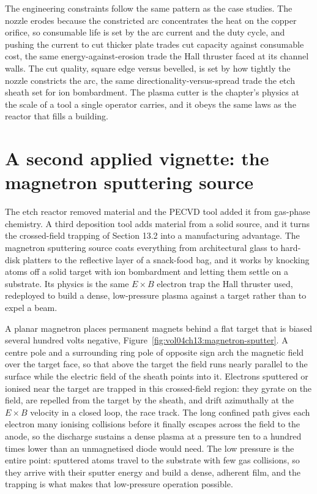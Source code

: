 The engineering constraints follow the same pattern as the case studies. The
nozzle erodes because the constricted arc concentrates the heat on the
copper orifice, so consumable life is set by the arc current and the
duty cycle, and pushing the current to cut thicker plate trades cut capacity
against consumable cost, the same energy-against-erosion trade the Hall
thruster faced at its channel walls. The cut quality, square edge versus
bevelled, is set by how tightly the nozzle constricts the arc, the same
directionality-versus-spread trade the etch sheath set for ion bombardment.
The plasma cutter is the chapter's physics at the scale of a tool a single
operator carries, and it obeys the same laws as the reactor that fills a
building.

\section{A second applied vignette: the magnetron sputtering source}

The etch reactor removed material and the PECVD tool added it from gas-phase
chemistry. A third deposition tool adds material from a solid source, and it
turns the crossed-field trapping of Section 13.2 into a manufacturing advantage.
The magnetron sputtering source coats everything from architectural glass to
hard-disk platters to the reflective layer of a snack-food bag, and it works by
knocking atoms off a solid target with ion bombardment and letting them settle
on a substrate. Its physics is the same $E\times B$ electron trap the Hall
thruster used, redeployed to build a dense, low-pressure plasma against a target
rather than to expel a beam.

A planar magnetron places permanent magnets behind a flat target that is biased
several hundred volts negative, Figure~\ref{fig:vol04ch13:magnetron-sputter}. A
centre pole and a surrounding ring pole of opposite sign arch the magnetic field
over the target face, so that above the target the field runs nearly parallel to
the surface while the electric field of the sheath points into it. Electrons
sputtered or ionised near the target are trapped in this crossed-field region:
they gyrate on the field, are repelled from the target by the sheath, and drift
azimuthally at the $E\times B$ velocity in a closed loop, the race track. The
long confined path gives each electron many ionising collisions before it
finally escapes across the field to the anode, so the discharge sustains a dense
plasma at a pressure ten to a hundred times lower than an unmagnetised diode
would need. The low pressure is the entire point: sputtered atoms travel to the
substrate with few gas collisions, so they arrive with their sputter energy and
build a dense, adherent film, and the trapping is what makes that low-pressure
operation possible.

